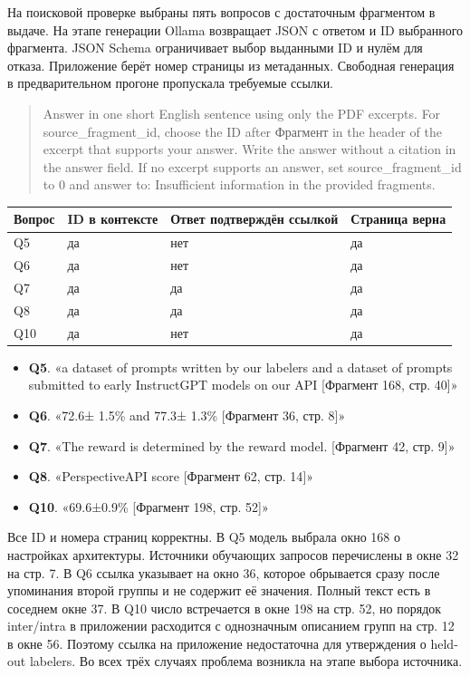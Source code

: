 \documentclass[12pt,a4paper]{article}
\providecommand{\tightlist}{\setlength{\itemsep}{0pt}\setlength{\parskip}{0pt}}
\begin{document}
На поисковой проверке выбраны пять вопросов с достаточным фрагментом в
выдаче. На этапе генерации Ollama возвращает JSON с ответом и ID
выбранного фрагмента. JSON Schema ограничивает выбор выданными ID и
нулём для отказа. Приложение берёт номер страницы из метаданных.
Свободная генерация в предварительном прогоне пропускала требуемые
ссылки.

\begin{quote}
Answer in one short English sentence using only the PDF excerpts. For
source\_fragment\_id, choose the ID after Фрагмент in the header of the
excerpt that supports your answer. Write the answer without a citation
in the answer field. If no excerpt supports an answer, set
source\_fragment\_id to 0 and answer to: Insufficient information in the
provided fragments.
\end{quote}

\begin{longtable}[]{@{}llll@{}}
\toprule\noalign{}
Вопрос & ID в контексте & Ответ подтверждён ссылкой & Страница верна \\
\midrule\noalign{}
\endhead
\bottomrule\noalign{}
\endlastfoot
Q5 & да & нет & да \\
Q6 & да & нет & да \\
Q7 & да & да & да \\
Q8 & да & да & да \\
Q10 & да & нет & да \\
\end{longtable}

\begin{itemize}
\tightlist
\item
  \textbf{Q5}. «a dataset of prompts written by our labelers and a
  dataset of prompts submitted to early InstructGPT models on our API
  {[}Фрагмент 168, стр. 40{]}»
\item
  \textbf{Q6}. «72.6± 1.5\% and 77.3± 1.3\% {[}Фрагмент 36, стр. 8{]}»
\item
  \textbf{Q7}. «The reward is determined by the reward model.
  {[}Фрагмент 42, стр. 9{]}»
\item
  \textbf{Q8}. «PerspectiveAPI score {[}Фрагмент 62, стр. 14{]}»
\item
  \textbf{Q10}. «69.6±0.9\% {[}Фрагмент 198, стр. 52{]}»
\end{itemize}

Все ID и номера страниц корректны. В Q5 модель выбрала окно 168 о
настройках архитектуры. Источники обучающих запросов перечислены в окне
32 на стр. 7. В Q6 ссылка указывает на окно 36, которое обрывается сразу
после упоминания второй группы и не содержит её значения. Полный текст
есть в соседнем окне 37. В Q10 число встречается в окне 198 на стр. 52,
но порядок inter/intra в приложении расходится с однозначным описанием
групп на стр. 12 в окне 56. Поэтому ссылка на приложение недостаточна
для утверждения о held-out labelers. Во всех трёх случаях проблема
возникла на этапе выбора источника.
\end{document}
